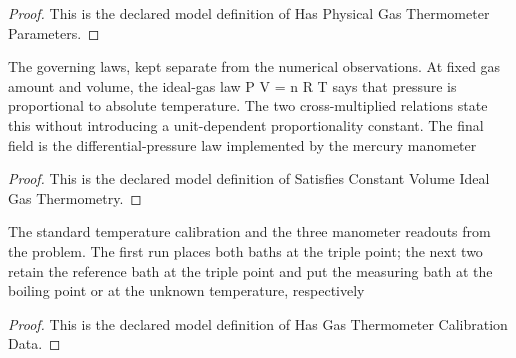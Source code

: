\begin{proof}
  This is the declared model definition of Has Physical Gas Thermometer Parameters.
\end{proof}
\begin{definition}
  \label{def:physics:phyx-mini-0157:phyxminiproblems-problemphyxmini0157-satisfiesconstantvolumeidealgasthermometry}
  The governing laws, kept separate from the numerical observations. At fixed gas amount and volume, the ideal-gas law P V = n R T says that pressure is proportional to absolute temperature. The two cross-multiplied relations state this without introducing a unit-dependent proportionality constant. The final field is the differential-pressure law implemented by the mercury manometer
\end{definition}
\begin{proof}
  This is the declared model definition of Satisfies Constant Volume Ideal Gas Thermometry.
\end{proof}
\begin{definition}
  \label{def:physics:phyx-mini-0157:phyxminiproblems-problemphyxmini0157-hasgasthermometercalibrationdata}
  The standard temperature calibration and the three manometer readouts from the problem. The first run places both baths at the triple point; the next two retain the reference bath at the triple point and put the measuring bath at the boiling point or at the unknown temperature, respectively
\end{definition}
\begin{proof}
  This is the declared model definition of Has Gas Thermometer Calibration Data.
\end{proof}
